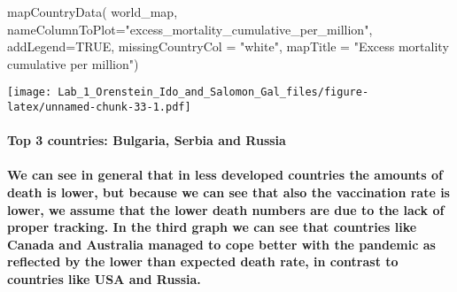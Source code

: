 \documentclass[
]{article}
\newenvironment{Shaded}{\begin{snugshade}}{\end{snugshade}}
\newcommand{\AttributeTok}[1]{\textcolor[rgb]{0.77,0.63,0.00}{#1}}
\newcommand{\ConstantTok}[1]{\textcolor[rgb]{0.00,0.00,0.00}{#1}}
\newcommand{\FunctionTok}[1]{\textcolor[rgb]{0.00,0.00,0.00}{#1}}
\newcommand{\NormalTok}[1]{#1}
\newcommand{\StringTok}[1]{\textcolor[rgb]{0.31,0.60,0.02}{#1}}
\begin{document}
\begin{Shaded}
\begin{Highlighting}[]
\FunctionTok{mapCountryData}\NormalTok{( world\_map, }\AttributeTok{nameColumnToPlot=}\StringTok{"excess\_mortality\_cumulative\_per\_million"}\NormalTok{, }\AttributeTok{addLegend=}\ConstantTok{TRUE}\NormalTok{, }\AttributeTok{missingCountryCol =} \StringTok{"white"}\NormalTok{, }\AttributeTok{mapTitle =} \StringTok{"Excess mortality cumulative per million"}\NormalTok{)}
\end{Highlighting}
\end{Shaded}

\texttt{[image: Lab\_1\_Orenstein\_Ido\_and\_Salomon\_Gal\_files/figure-latex/unnamed-chunk-33-1.pdf]}

\hypertarget{top-3-countries-bulgaria-serbia-and-russia}{%
\paragraph{Top 3 countries: Bulgaria, Serbia and
Russia}\label{top-3-countries-bulgaria-serbia-and-russia}}

\hypertarget{we-can-see-in-general-that-in-less-developed-countries-the-amounts-of-death-is-lower-but-because-we-can-see-that-also-the-vaccination-rate-is-lower-we-assume-that-the-lower-death-numbers-are-due-to-the-lack-of-proper-tracking.-in-the-third-graph-we-can-see-that-countries-like-canada-and-australia-managed-to-cope-better-with-the-pandemic-as-reflected-by-the-lower-than-expected-death-rate-in-contrast-to-countries-like-usa-and-russia.}{%
\paragraph{We can see in general that in less developed countries the
amounts of death is lower, but because we can see that also the
vaccination rate is lower, we assume that the lower death numbers are
due to the lack of proper tracking. In the third graph we can see that
countries like Canada and Australia managed to cope better with the
pandemic as reflected by the lower than expected death rate, in contrast
to countries like USA and
Russia.}\label{we-can-see-in-general-that-in-less-developed-countries-the-amounts-of-death-is-lower-but-because-we-can-see-that-also-the-vaccination-rate-is-lower-we-assume-that-the-lower-death-numbers-are-due-to-the-lack-of-proper-tracking.-in-the-third-graph-we-can-see-that-countries-like-canada-and-australia-managed-to-cope-better-with-the-pandemic-as-reflected-by-the-lower-than-expected-death-rate-in-contrast-to-countries-like-usa-and-russia.}}
\end{document}
